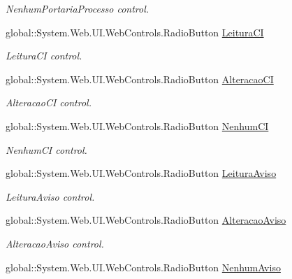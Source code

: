 \begin{DoxyCompactItemize}
\begin{DoxyCompactList}\small\item\em NenhumPortariaProcesso control. \item\end{DoxyCompactList}\item 
global::System.Web.UI.WebControls.RadioButton \hyperlink{class_sistema_r_h_1_1_cadastro_user_a8946e4f8ad86ff95fccd7addf69c24c4}{LeituraCI}
\begin{DoxyCompactList}\small\item\em LeituraCI control. \item\end{DoxyCompactList}\item 
global::System.Web.UI.WebControls.RadioButton \hyperlink{class_sistema_r_h_1_1_cadastro_user_aff41ea22a6a0792bdea569a01bd8728b}{AlteracaoCI}
\begin{DoxyCompactList}\small\item\em AlteracaoCI control. \item\end{DoxyCompactList}\item 
global::System.Web.UI.WebControls.RadioButton \hyperlink{class_sistema_r_h_1_1_cadastro_user_ae4b7e53f819b4ebb952f046dc38e9b55}{NenhumCI}
\begin{DoxyCompactList}\small\item\em NenhumCI control. \item\end{DoxyCompactList}\item 
global::System.Web.UI.WebControls.RadioButton \hyperlink{class_sistema_r_h_1_1_cadastro_user_a2cc5c0efea3d1e92ef8f2cc32282cb1c}{LeituraAviso}
\begin{DoxyCompactList}\small\item\em LeituraAviso control. \item\end{DoxyCompactList}\item 
global::System.Web.UI.WebControls.RadioButton \hyperlink{class_sistema_r_h_1_1_cadastro_user_abb276f2edcd294396021a816b7be69f1}{AlteracaoAviso}
\begin{DoxyCompactList}\small\item\em AlteracaoAviso control. \item\end{DoxyCompactList}\item 
global::System.Web.UI.WebControls.RadioButton \hyperlink{class_sistema_r_h_1_1_cadastro_user_ab52561cadeaba4e91a2bff50eaa10944}{NenhumAviso}

\end{DoxyCompactItemize}
